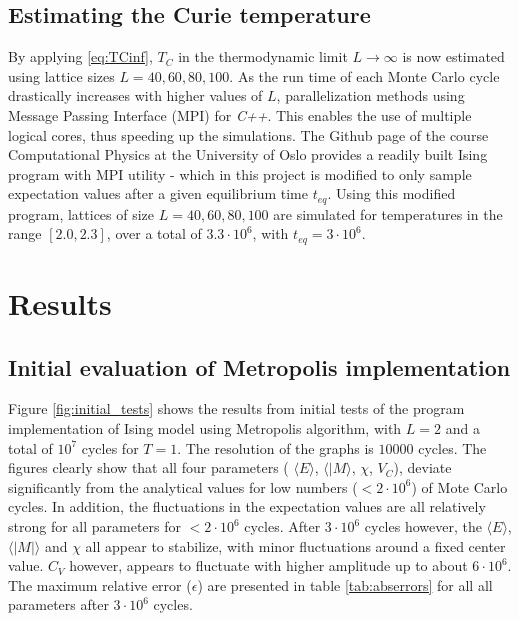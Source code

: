 \documentclass[%
oneside,                 %
final,                   %
10pt]{article}
\begin{document}
\subsection{Estimating the Curie temperature}
\label{SS.Est.Curie}
By applying \eqref{eq:TCinf}, $T_C$ in the thermodynamic limit $L \rightarrow \infty$ is now estimated using lattice sizes $L=40, 60, 80,100$. As the run time of each Monte Carlo cycle drastically increases with higher values of $L$, parallelization methods using Message Passing Interface (MPI) for \textit{C++}. This enables the use of multiple logical cores, thus speeding up the simulations.  The Github page of the course Computational Physics at the University of Oslo \cite{CPgithub} provides a readily built Ising program with MPI utility - which in this project is modified to only sample expectation values after a given equilibrium time $t_{eq}$. Using this modified program, lattices of size $L=40, 60, 80, 100$ are simulated for temperatures in the range $[2.0,2.3]$, over a total of $3.3 \cdot 10^6$, with $t_{eq}=3 \cdot 10^6$. 

\section{Results}
\subsection{Initial evaluation of Metropolis implementation}
\label{SS:R.initialeval}
Figure \ref{fig:initial_tests} shows the results from initial tests of the program implementation of Ising model using Metropolis algorithm, with $L=2$ and a total of $10^7$ cycles for $T=1$. The resolution of the graphs is $10000$ cycles. The figures clearly show that all four parameters ( $\langle E \rangle$, $\langle | M \rangle$, $\chi$, $V_C$), deviate significantly from the analytical values for low numbers ($<2 \cdot 10^6 $) of Mote Carlo cycles. In addition, the fluctuations in the expectation values are all relatively strong for all parameters for $<2 \cdot 10^6 $ cycles. After $3 \cdot 10^6$ cycles however, the $\langle E\rangle$, $\langle |M| \rangle$ and $\chi$ all appear to stabilize, with minor fluctuations around a fixed center value. $C_V$ however, appears to fluctuate with higher amplitude up to about $6 \cdot 10^6$. The maximum relative error ($\epsilon$) are presented in table  \ref{tab:abserrors} for all all parameters after $3 \cdot 10^6$ cycles.
\end{document}
